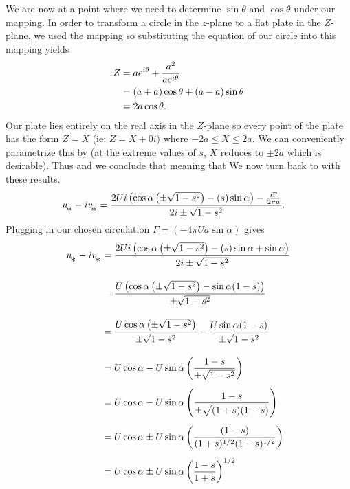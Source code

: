 \documentclass[12pt]{book}
\begin{document}
{We are now at a point where we need to determine $\sin\theta$ and $\cos\theta$ under our mapping.  In order to transform a circle in the $z$-plane to a flat plate in the $Z$-plane, we used the mapping
so substituting the equation of our circle into this mapping yields
\begin{align}
Z &= ae^{i\theta} + \frac{a^2}{ae^{i\theta}} \notag\\
&= (a + a)\cos\theta + (a-a)\sin\theta\notag  \\
&=2a\cos\theta.
\end{align}
Our plate lies entirely on the real axis in the $Z$-plane so every point of the plate has the form $Z=X$ (ie: $ Z=X+0i)$ where $-2a\le X\le 2a$.  We can conveniently parametrize this by
(at the extreme values of $s$, $X$ reduces to $\pm2a$ which is desirable).  Thus
and we conclude that
meaning that
We now turn back to  with these results.
\begin{align}
u\substar - iv\substar &= \frac{2Ui\left(\cos\alpha \left(\pm\sqrt{1-s^2}\right) - (s)\sin\alpha\right) - \frac{i\Gamma }{2\pi a} }{2i \pm\sqrt{1-s^2}}.
\end{align}
Plugging in our chosen circulation $\Gamma = (-4\pi U a \sin\alpha)$ gives
\begin{align*}
u\substar - iv\substar &= \frac{2Ui\left(\cos\alpha \left(\pm\sqrt{1-s^2}\right) - (s)\sin\alpha + \sin\alpha \right)}{2i \pm\sqrt{1-s^2}} \\[1em]
&= \frac{U\left(\cos\alpha \left(\pm\sqrt{1-s^2}\right) - \sin\alpha (1-s) \right)}{ \pm\sqrt{1-s^2}} \\[1em]
&= \frac{U\cos\alpha \left(\pm\sqrt{1-s^2}\right) }{  \pm\sqrt{1-s^2} } - \frac{U\sin\alpha (1-s) }{ \pm\sqrt{1-s^2}} \\[1em]
&= U\cos\alpha - U\sin\alpha \left(\frac{1-s }{ \pm\sqrt{1-s^2}}\right) \\[0.5em]
&= U\cos\alpha - U\sin\alpha \left(\frac{1-s}{ \pm\sqrt{(1+s)(1-s)}}\right) \\[0.5em]
&= U\cos\alpha \pm U\sin\alpha \left(\frac{(1-s)}{(1+s)^{1/2}(1-s)^{1/2}}\right) \\[0.5em]
&= U\cos\alpha \pm U\sin\alpha \left(\frac{ 1-s}{1+s}\right)^{1/2}
\end{align*}
}
\end{document}
